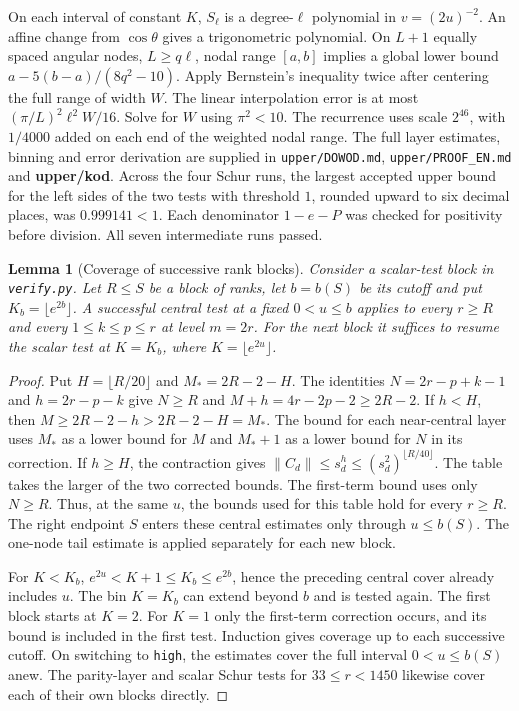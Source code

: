 \documentclass[11pt,a4paper,reqno]{amsart}
\newtheorem{lemma}[theorem]{Lemma}
\numberwithin{equation}{section}
\begin{document}
 On each interval of constant \(K\), \(S_\ell\) is a degree-\(\ell\) polynomial in \(v=(2u)^{-2}\). An affine change from \(\cos\theta\) gives a trigonometric polynomial. On \(L+1\) equally spaced angular nodes, \(L\ge q\ell\), nodal range \([a,b]\) implies a global lower bound \(a-5(b-a)/(8q^2-10)\). Apply Bernstein's inequality twice after centering the full range of width \(W\). The linear interpolation error is at most \((\pi/L)^2\ell^2W/16\). Solve for \(W\) using \(\pi^2<10\). The recurrence uses scale \(2^{46}\), with \(1/4000\) added on each end of the weighted nodal range. The full layer estimates, binning and error derivation are supplied in \texttt{upper/DOWOD.md}, \texttt{upper/PROOF\_EN.md} and \textbf{upper/kod}. Across the four Schur runs, the largest accepted upper bound for the left sides of the two tests with threshold \(1\), rounded upward to six decimal places, was \(0.999141<1\). Each denominator \(1-e-P\) was checked for positivity before division. All seven intermediate runs passed.

\begin{lemma}[Coverage of successive rank blocks]\label{lem:blocks}
Consider a scalar-test block in \texttt{verify.py}. Let \(R\le S\) be a block of ranks, let \(b=b(S)\) be its cutoff and put \(K_b=\lfloor e^{2b}\rfloor\). A successful central test at a fixed \(0<u\le b\) applies to every \(r\ge R\) and every \(1\le k\le p\le r\) at level \(m=2r\). For the next block it suffices to resume the scalar test at \(K=K_b\), where \(K=\lfloor e^{2u}\rfloor\).
\end{lemma}
\begin{proof}
Put \(H=\lfloor R/20\rfloor\) and \(M_*=2R-2-H\). The identities \(N=2r-p+k-1\) and \(h=2r-p-k\) give \(N\ge R\) and \(M+h=4r-2p-2\ge2R-2\). If \(h<H\), then \(M\ge 2R-2-h>2R-2-H=M_*\). The bound for each near-central layer uses \(M_*\) as a lower bound for \(M\) and \(M_*+1\) as a lower bound for \(N\) in its correction. If \(h\ge H\), the contraction gives \(\|C_d\|\le s_d^h\le(s_d^2)^{\lfloor R/40\rfloor}\). The table takes the larger of the two corrected bounds. The first-term bound uses only \(N\ge R\). Thus, at the same \(u\), the bounds used for this table hold for every \(r\ge R\). The right endpoint \(S\) enters these central estimates only through \(u\le b(S)\). The one-node tail estimate is applied separately for each new block.

For \(K<K_b\), \(e^{2u}<K+1\le K_b\le e^{2b}\), hence the preceding central cover already includes \(u\). The bin \(K=K_b\) can extend beyond \(b\) and is tested again. The first block starts at \(K=2\). For \(K=1\) only the first-term correction occurs, and its bound is included in the first test. Induction gives coverage up to each successive cutoff. On switching to \texttt{high}, the estimates cover the full interval \(0<u\le b(S)\) anew. The parity-layer and scalar Schur tests for \(33\le r<1450\) likewise cover each of their own blocks directly.
\end{proof}
\end{document}
